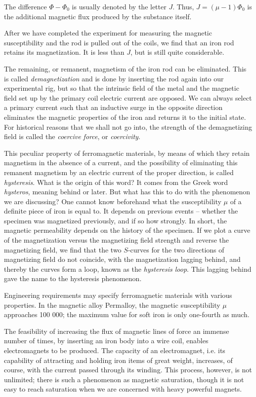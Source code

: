 The difference $\Phi - \Phi_{0}$ is usually denoted by the letter $J$. Thus, $J = (\mu - 1) \Phi_{0}$ is the additional magnetic flux produced by the substance itself.

After we have completed the experiment for measuring the magnetic susceptibility and the rod is pulled out of the coils, we find that an iron rod retains its magnetization. It is less than $J$, but is still quite considerable.


The remaining, or remanent, magnetism of the iron rod can be eliminated. This is called \emph{demagnetization} and is done by inserting the rod again into our experimental rig, but so that the intrinsic field of the metal and the magnetic field set up by the primary coil electric current are opposed. We can always select a primary current such that an inductive surge in the opposite direction eliminates the magnetic properties of the iron and returns it to the initial state. For historical reasons that we shall not go into, the strength of the demagnetizing field is called the \emph{coercive force}, or \emph{coercivity}.

This peculiar property of ferromagnetic materials, by means of which they retain magnetism in the absence of a current, and the possibility of eliminating this remanent magnetism by an electric current of the proper direction, is called \emph{hysteresis}. What is the origin of this word? It comes from the Greek word \emph{hysteros}, meaning behind or later. But what has this to do with the phenomenon we are discussing? One cannot know beforehand what the susceptibility $\mu$ of a definite piece of iron is equal to. It depends on previous events -- whether the specimen was magnetized previously, and if so how strongly. In short, the magnetic permeability depends on the history of the specimen. If we plot a curve of the magnetization versus the magnetizing field strength and reverse the magnetizing field, we find that the two $S$-curves for the two directions of magnetizing field do not coincide, with the magnetization lagging behind, and thereby the curves form a loop, known as the \emph{hysteresis loop}. This lagging behind gave the name to the hysteresis phenomenon.

Engineering requirements may specify ferromagnetic materials with various properties. In the magnetic alloy Permalloy, the magnetic susceptibility $\mu$ approaches 100 000; the maximum value for soft iron is only one-fourth as much.

The feasibility of increasing the flux of magnetic lines of force an immense number of times, by inserting an iron body into a wire coil, enables electromagnets to be produced. The capacity of an electromagnet, i.e. its capability of attracting and holding iron items of great weight, increases, of course, with the current passed through its winding. This process, however, is not unlimited; there is such a phenomenon as magnetic saturation, though it is not easy to reach saturation when we are concerned with heavy powerful magnets.

